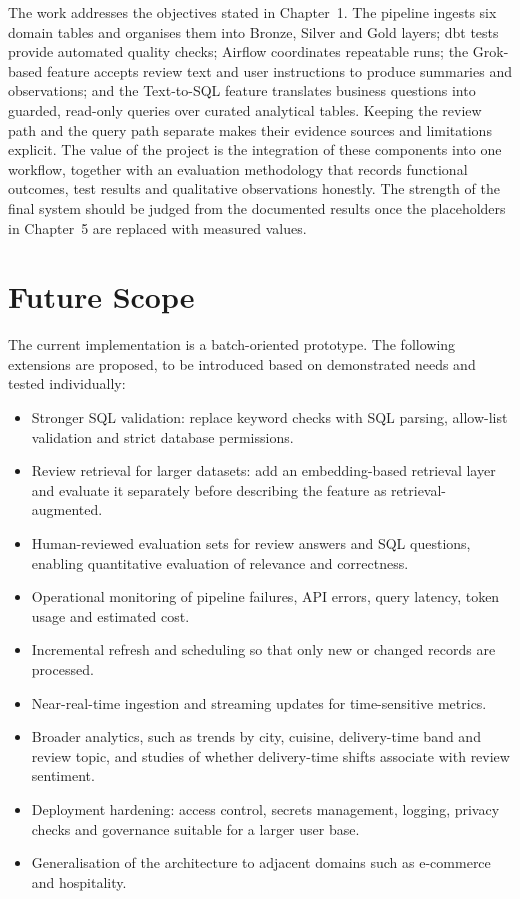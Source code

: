 \documentclass[12pt,a4paper]{report}
\begin{document}
The work addresses the objectives stated in Chapter~1. The pipeline ingests six domain tables and organises them into Bronze, Silver and Gold layers; dbt tests provide automated quality checks; Airflow coordinates repeatable runs; the Grok-based feature accepts review text and user instructions to produce summaries and observations; and the Text-to-SQL feature translates business questions into guarded, read-only queries over curated analytical tables. Keeping the review path and the query path separate makes their evidence sources and limitations explicit. The value of the project is the integration of these components into one workflow, together with an evaluation methodology that records functional outcomes, test results and qualitative observations honestly. The strength of the final system should be judged from the documented results once the placeholders in Chapter~5 are replaced with measured values.

\section{Future Scope}
The current implementation is a batch-oriented prototype. The following extensions are proposed, to be introduced based on demonstrated needs and tested individually:
\begin{itemize}[leftmargin=2em]
\item Stronger SQL validation: replace keyword checks with SQL parsing, allow-list validation and strict database permissions.
\item Review retrieval for larger datasets: add an embedding-based retrieval layer and evaluate it separately before describing the feature as retrieval-augmented.
\item Human-reviewed evaluation sets for review answers and SQL questions, enabling quantitative evaluation of relevance and correctness.
\item Operational monitoring of pipeline failures, API errors, query latency, token usage and estimated cost.
\item Incremental refresh and scheduling so that only new or changed records are processed.
\item Near-real-time ingestion and streaming updates for time-sensitive metrics.
\item Broader analytics, such as trends by city, cuisine, delivery-time band and review topic, and studies of whether delivery-time shifts associate with review sentiment.
\item Deployment hardening: access control, secrets management, logging, privacy checks and governance suitable for a larger user base.
\item Generalisation of the architecture to adjacent domains such as e-commerce and hospitality.
\end{itemize}
\end{document}

